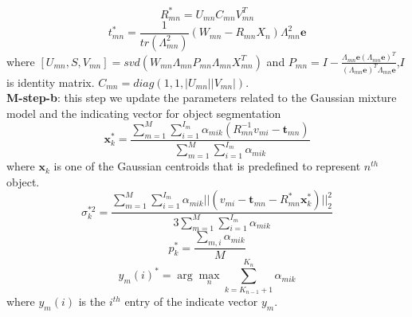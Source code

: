 \begin{equation}
\label{equ:updateR}
R_{mn}^*=U_{mn}C_{mn}V_{mn}^T
\end{equation}
\begin{equation}
\label{equ:updatet}
t_{mn}^*=\frac{1}{tr(\Lambda_{mn}^2)}(W_{mn}-R_{mn}X_n)\Lambda_{mn}^2\mathbf{e}
\end{equation}
where $[U_{mn},S,V_{mn}]=svd( W_{mn}\Lambda_{mn}P_{mn}\Lambda_{mn}X_{mn}^T )$ and $P_{mn}=I-\frac{\Lambda_{mn}\mathbf{e}(\Lambda_{mn}\mathbf{e})^T}{(\Lambda_{mn}\mathbf{e})^T\Lambda_{mn}\mathbf{e}}$,$I$ is identity matrix. $C_{mn}=diag(1,1,|U_{mn}||V_{mn}|)$.\\
\textbf{M-step-b}: this step we update the parameters related to the Gaussian mixture model and the indicating vector for object segmentation 
\begin{equation}
\label{equ:updatexk}
\pmb x_k^*=\frac{\sum_{m=1}^M\sum_{i=1}^{I_m}\alpha_{mik}(R_{mn}^{-1}v_{mi}-\pmb t_{mn})}{\sum_{m=1}^M\sum_{i=1}^{I_m}\alpha_{mik}}
\end{equation}
where $\pmb x_k$ is one of the Gaussian centroids that is predefined to represent $n^{th}$ object. 
\begin{equation}
\label{equ:updatesigma}
\sigma_k^{*2}=\frac{\sum_{m=1}^M\sum_{i=1}^{I_m}\alpha_{mik}||(v_{mi}-\pmb t_{mn}-R_{mn}^*\pmb x_k^*)||_2^2}{3\sum_{m=1}^M\sum_{i=1}^{I_m}\alpha_{mik}}
\end{equation}
\begin{equation}
\label{equ:updatepk}
p_k^*=\frac{\sum_{m,i}\alpha_{mik}}{M}
\end{equation}
\begin{equation}
\label{equ:updatey}
y_{m}(i)^*=\arg \max_n \sum_{k=K_{n-1}+1}^{K_n} \alpha_{mik} 
\end{equation}
where $y_{m}(i)$ is the $i^{th}$ entry of the indicate vector $y_m$.
